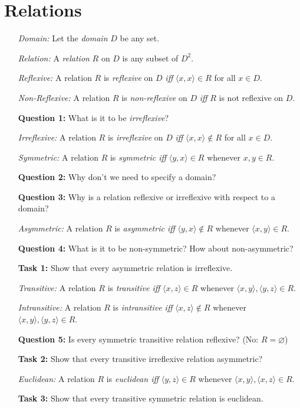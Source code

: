 \documentclass[a4paper, 11pt]{article} %
\newcommand{\tuple}[1]{\langle#1\rangle} %
\begin{document}
\section*{Relations}

\begin{enumerate}
  \item[\it Domain:] Let the \textit{domain} $D$ be any set.
  \item[\it Relation:] A \textit{relation} $R$ on $D$ is any subset of $D^2$.
  \item[\it Reflexive:] A relation $R$ is \textit{reflexive} on $D$ \textit{iff} $\tuple{x,x}\in R$ for all $x\in D$.
  \item[\it Non-Reflexive:] A relation $R$ is \textit{non-reflexive} on $D$ \textit{iff} $R$ is not reflexive on $D$.
  \item[\bf Question 1:] What is it to be \textit{irreflexive}?
  \item[\it Irreflexive:] A relation $R$ is \textit{irreflexive} on $D$ \textit{iff} $\tuple{x,x}\notin R$ for all $x\in D$.
  \item[\it Symmetric:] A relation $R$ is \textit{symmetric iff} $\tuple{y,x}\in R$ whenever ${x,y}\in R$.
  \item[\bf Question 2:] Why don't we need to specify a domain?
  \item[\bf Question 3:] Why is a relation reflexive or irreflexive with respect to a domain?
  \item[\it Asymmetric:] A relation $R$ is \textit{asymmetric iff} $\tuple{y,x}\notin R$ whenever $\tuple{x,y}\in R$.
  \item[\bf Question 4:] What is it to be non-symmetric? How about non-asymmetric?
  \item[\bf Task 1:] Show that every asymmetric relation is irreflexive.
  \item[\it Transitive:] A relation $R$ is \textit{transitive iff} $\tuple{x,z}\in R$ whenever $\tuple{x,y},\tuple{y,z}\in R$.
  \item[\it Intransitive:] A relation $R$ is \textit{intransitive iff} $\tuple{x,z}\notin R$ whenever $\tuple{x,y},\tuple{y,z}\in R$.
  \item[\bf Question 5:] Is every symmetric transitive relation reflexive? (No: $R=\varnothing$)
  \item[\bf Task 2:] Show that every transitive irreflexive relation asymmetric?
  \item[\it Euclidean:] A relation $R$ is \textit{euclidean iff} $\tuple{y,z}\in R$ whenever $\tuple{x,y},\tuple{x,z}\in R$.
  \item[\bf Task 3:] Show that every transitive symmetric relation is euclidean.
\end{enumerate}


\end{document}
